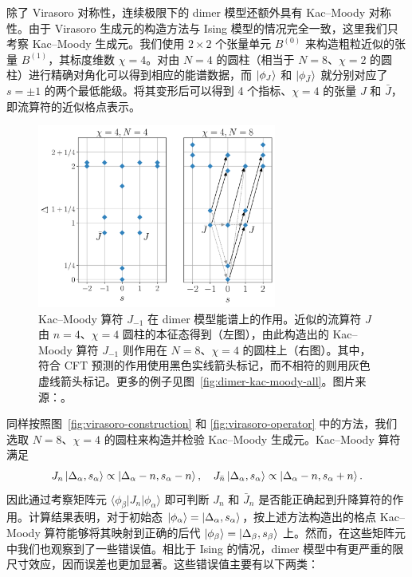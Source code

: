 除了 Virasoro 对称性，连续极限下的 dimer 模型还额外具有 Kac--Moody 对称性。由于 Virasoro 生成元的构造方法与 Ising 模型的情况完全一致，这里我们只考察 Kac--Moody 生成元。我们使用 $2\times2$ 个张量单元 $B^{(0)}$ 来构造粗粒近似的张量 $B^{(1)}$，其标度维数 $\chi=4$。对由 $N=4$ 的圆柱（相当于 $N=8$、$\chi=2$ 的圆柱）进行精确对角化可以得到相应的能谱数据，而 $\ket*{\phi_J}$ 和 $\ket*{\phi_{\bar{J}}}$ 就分别对应了 $s=\pm1$ 的两个最低能级。将其变形后可以得到 4 个指标、$\chi=4$ 的张量 $J$ 和 $\bar{J}$，即流算符的近似格点表示。

\begin{figure}[ht]
  \centering
  \includegraphics[width=0.7\textwidth]{images/virasoro/dimer-spectrum.pdf}
  \caption[Kac--Moody 算符在 dimer 模型能谱上的作用]{Kac--Moody 算符 $J_{-1}$ 在 dimer 模型能谱上的作用。近似的流算符 $J$ 由 $n=4$、$\chi=4$ 圆柱的本征态得到（左图），由此构造出的 Kac--Moody 算符 $J_{-1}$ 则作用在 $N=8$、$\chi=4$ 的圆柱上（右图）。其中，符合 CFT 预测的作用使用黑色实线箭头标记，而不相符的则用灰色虚线箭头标记。更多的例子见图~\ref{fig:dimer-kac-moody-all}。图片来源：\parencite{wang2022virasoro}。}
  \label{fig:dimer-kac-moody}
\end{figure}

同样按照图~\ref{fig:virasoro-construction} 和 \ref{fig:virasoro-operator} 中的方法，我们选取 $N=8$、$\chi=4$ 的圆柱来构造并检验 Kac--Moody 生成元。Kac--Moody 算符满足
\begin{equation}
  J_n         \ket{\Delta_\alpha, s_\alpha} \propto \ket{\Delta_\alpha-n, s_\alpha-n}, \quad
  J_{\bar{n}} \ket{\Delta_\alpha, s_\alpha} \propto \ket{\Delta_\alpha-n, s_\alpha+n}.
\end{equation}
因此通过考察矩阵元 $\langle\phi_\beta|J_n|\phi_\alpha\rangle$ 即可判断 $J_n$ 和 $\bar{J}_n$ 是否能正确起到升降算符的作用。计算结果表明，对于初始态 $\ket{\phi_\alpha}=\ket{\Delta_\alpha,s_\alpha}$，按上述方法构造出的格点 Kac--Moody 算符能够将其映射到正确的后代 $\ket{\phi_\beta}=\ket{\Delta_\beta,s_\beta}$ 上。然而，在这些矩阵元中我们也观察到了一些错误值。相比于 Ising 的情况，dimer 模型中有更严重的限尺寸效应，因而误差也更加显著。这些错误值主要有以下两类：

